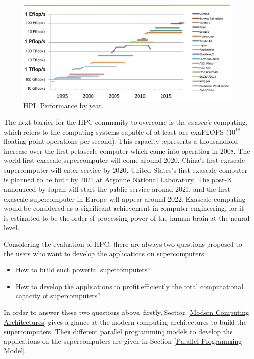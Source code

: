 \begin{figure}[t]
	\centering
	\includegraphics[width=6.3in]{fig/top500_3.pdf}
	\caption{HPL Performance by year.}
	\label{hpl_by_year}
\end{figure}

The next barrier for the HPC community to overcome is the \textit{exascale} computing, which refers to the computing systems capable of at least one exaFLOPS ($10^{18}$ floating point operations per second). This capacity represents a thousandfold increase over the first petascale computer which came into operation in 2008. The world first exascale supercomputer will come around 2020. China's first exascale supercomputer will enter service by 2020. United States's first exascale computer is planned to be built by 2021 at Argonne National Laboratory. The post-K announced by Japan will start the public service around 2021, and the first exascale supercomputer in Europe will appear around 2022. Exascale computing would be considered as a significant achievement in computer engineering, for it is estimated to be the order of processing power of the human brain at the neural level.

Considering the evaluation of HPC, there are always two questions proposed to the users who want to develop the applications on supercomputers:

\begin{itemize}
	\item How to build such powerful supercomputers?
	\item How to develop the applications to profit efficiently the total computational capacity of supercomputers?
\end{itemize}

In order to answer these two questions above, firstly, Section \ref{Modern Computing Architectures} gives a glance at the modern computing architectures to build the supercomputers. Then different parallel programming models to develop the applications on the supercomputers are given in Section \ref{Parallel Programming Model}.


